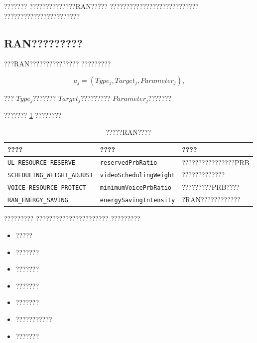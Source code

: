 ???????
??????????????RAN?????
???????????????????????????
???????????????????????


\subsection*{RAN?????????}

???RAN???????????????
?????????

\begin{equation}
a_j
=
\left(
Type_j,
Target_j,
Parameter_j
\right),
\label{eq:ran_action_primitive_reduced}
\end{equation}

???
$Type_j$???????
$Target_j$?????????
$Parameter_j$???????

???????
\ref{tab:ran_action_primitives_reduced}
????????

\begin{table}[H]
    \centering
    \caption{?????RAN????}
    \label{tab:ran_action_primitives_reduced}
    \small
    \renewcommand{\arraystretch}{1.25}
    \begin{tabularx}{\textwidth}{
        >{\raggedright\arraybackslash}p{}
        >{\raggedright\arraybackslash}p{}
        >{\raggedright\arraybackslash}X
    }
        \toprule
        ???? & ???? & ???? \\
        \midrule

        \texttt{UL\_RESOURCE\_RESERVE}
        & \texttt{reservedPrbRatio}
        & ????????????????PRB
        \\

        \texttt{SCHEDULING\_WEIGHT\_ADJUST}
        & \texttt{videoSchedulingWeight}
        & ?????????????
        \\

        \texttt{VOICE\_RESOURCE\_PROTECT}
        & \texttt{minimumVoicePrbRatio}
        & ?????????PRB????
        \\

        \texttt{RAN\_ENERGY\_SAVING}
        & \texttt{energySavingIntensity}
        & ?RAN????????????
        \\

        \bottomrule
    \end{tabularx}
\end{table}

?????????
??????????????????????
?????????

\begin{itemize}
    \item ?????
    \item ???????
    \item ???????
    \item ???????
    \item ???????
    \item ???????????
    \item ???????
\end{itemize}

